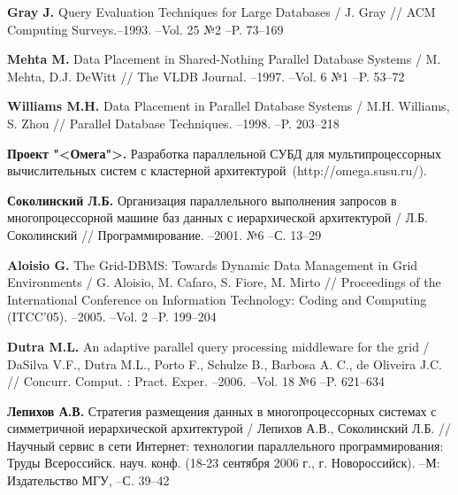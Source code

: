 \documentclass[11pt,oneside]{article}
\begin{document}
	\begin{thebibliography}{X}
		 {\bf Gray J.} {\sf Query Evaluation Techniques for Large Databases} / J. Gray // ACM Computing Surveys.--1993. --Vol. 25 №{2} --P. 73--169\vspace{-2mm}
		
		 {\bf Mehta M.} {\sf Data Placement in Shared-Nothing Parallel Database Systems} / M. Mehta, D.J. DeWitt // The VLDB Journal. --1997. --Vol. 6 №{1} --P. 53--72\vspace{-2mm}
		
		 {\bf Williams M.H.} {\sf Data Placement in Parallel Database Systems} / M.H. Williams, S. Zhou // Parallel Database Techniques. --1998. --P. 203--218\vspace{-2mm}
		
		 {\bf Проект "<Омега">.} {\sf  Разработка параллельной СУБД для мультипроцессорных вычислительных систем с кластерной архитектурой}\ (http://omega.susu.ru/).
		
		
		 {\bf Соколинский Л.Б.} {\sf Организация параллельного выполнения запросов в многопроцессорной машине баз данных с иерархической архитектурой} / Л.Б. Соколинский // Программирование. --2001. №{6} --С. 13--29\vspace{-2mm}
		
		 {\bf Aloisio G.} {\sf The Grid-DBMS: Towards Dynamic Data Management in Grid Environments} / G. Aloisio, M. Cafaro, S. Fiore, M. Mirto // Proceedings of the International Conference on Information Technology: Coding and Computing (ITCC'05). --2005. --Vol. 2 --P. 199--204\vspace{-2mm}
		
		 {\bf Dutra M.L.} {\sf An adaptive parallel query processing middleware for the grid} / DaSilva V.F., Dutra M.L., Porto F., Schulze B., Barbosa A. C., de Oliveira J.C. // Concurr. Comput. : Pract. Exper. --2006. --Vol. 18 №{6} --P. 621--634\vspace{-2mm}
		
		 {\bf Лепихов А.В.} {\sf Стратегия размещения данных в многопроцессорных системах с симметричной иерархической архитектурой} / Лепихов А.В., Соколинский Л.Б. // Научный сервис в сети Интернет: технологии параллельного программирования: Труды Всероссийск. науч. конф. (18-23 сентября 2006 г., г. Новороссийск). --М: Издательство МГУ, --С. 39--42\vspace{-2mm}
		

\end{thebibliography}
\end{document}
